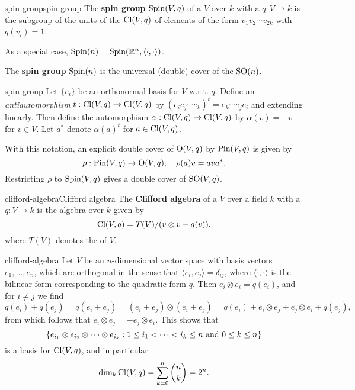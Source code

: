 \begin{topic}{spin-group}{spin group}
    The \textbf{spin group} $\textup{Spin}(V, q)$ of a  $V$ over $k$ with a  $q : V \to k$ is the subgroup of the units of the  $\textup{Cl}(V, q)$ of elements of the form $v_1 v_2 \cdots v_{2k}$ with $q(v_i) = 1$.

    As a special case, $\textup{Spin}(n) = \textup{Spin}(\mathbb{R}^n, \langle \cdot, \cdot \rangle)$.
    
    The \textbf{spin group} $\textup{Spin}(n)$ is the universal (double) cover of the  $\textup{SO}(n)$.
\end{topic}

\begin{example}{spin-group}
    Let $\{ e_i \}$ be an orthonormal basis for $V$ w.r.t. $q$. Define an \textit{antiautomorphism} $t : \textup{Cl}(V, q) \to \textup{Cl}(V, q)$ by $(e_i e_j \cdots e_k)^t = e_k \cdots e_j e_i$ and extending linearly. Then define the automorphism $\alpha : \textup{Cl}(V, q) \to \textup{Cl}(V, q)$ by $\alpha(v) = -v$ for $v \in V$. Let $a^*$ denote $\alpha(a)^t$ for $a \in \textup{Cl}(V, q)$.
    
    With this notation, an explicit double cover of $\textup{O}(V, q)$ by $\textup{Pin}(V, q)$ is given by
    \[ \rho : \textup{Pin}(V, q) \to \textup{O}(V, q), \quad \rho(a) v = a v a^* . \]
    Restricting $\rho$ to $\textup{Spin}(V, q)$ gives a double cover of $\textup{SO}(V, q)$.
\end{example}

\begin{topic}{clifford-algebra}{Clifford algebra}
    The \textbf{Clifford algebra} of a  $V$ over a field $k$ with a  $q : V \to k$ is the algebra over $k$ given by
    \[ \textup{Cl}(V, q) = T(V) / (v \otimes v - q(v)) , \]
    where $T(V)$ denotes the  of $V$.
\end{topic}

\begin{example}{clifford-algebra}
    Let $V$ be an $n$-dimensional vector space with basis vectors $e_1, \ldots, e_n$, which are orthogonal in the sense that $\langle e_i, e_j \rangle = \delta_{ij}$, where $\langle \cdot, \cdot \rangle$ is the bilinear form corresponding to the quadratic form $q$. Then $e_i \otimes e_i = q(e_i)$, and for $i \ne j$ we find
    \[ q(e_i) + q(e_j) = q(e_i + e_j) = (e_i + e_j) \otimes (e_i + e_j) = q(e_i) + e_i \otimes e_j + e_j \otimes e_i + q(e_j) , \]
    from which follows that $e_i \otimes e_j = - e_j \otimes e_i$. This shows that
    \[ \{ e_{i_1} \otimes e_{i_2} \otimes \cdots \otimes e_{i_k} : 1 \le i_1 < \cdots < i_k \le n \textup{ and } 0 \le k \le n  \} \]
    is a basis for $\textup{Cl}(V, q)$, and in particular
    \[ \dim_k \textup{Cl}(V, q) = \sum_{k = 0}^{n} \binom{n}{k} = 2^n . \]
\end{example}

